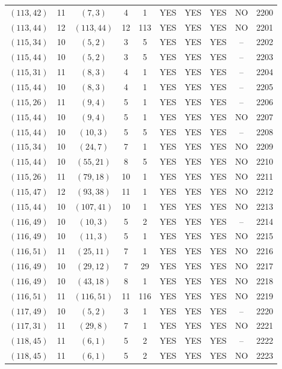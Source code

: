 \begin{longtable}{|c|c|c|c|c|c|c|c|c|c|}
$(113, 42)$ & 11 & $(7, 3)$ & 4 & 1 & YES & YES & YES & NO & 2200\\
$(113, 44)$ & 12 & $(113, 44)$ & 12 & 113 & YES & YES & YES & NO & 2201\\
$(115, 34)$ & 10 & $(5, 2)$ & 3 & 5 & YES & YES & YES & -- & 2202\\
$(115, 44)$ & 10 & $(5, 2)$ & 3 & 5 & YES & YES & YES & -- & 2203\\
$(115, 31)$ & 11 & $(8, 3)$ & 4 & 1 & YES & YES & YES & -- & 2204\\
$(115, 44)$ & 10 & $(8, 3)$ & 4 & 1 & YES & YES & YES & -- & 2205\\
$(115, 26)$ & 11 & $(9, 4)$ & 5 & 1 & YES & YES & YES & -- & 2206\\
$(115, 44)$ & 10 & $(9, 4)$ & 5 & 1 & YES & YES & YES & NO & 2207\\
$(115, 44)$ & 10 & $(10, 3)$ & 5 & 5 & YES & YES & YES & -- & 2208\\
$(115, 34)$ & 10 & $(24, 7)$ & 7 & 1 & YES & YES & YES & NO & 2209\\
$(115, 44)$ & 10 & $(55, 21)$ & 8 & 5 & YES & YES & YES & NO & 2210\\
$(115, 26)$ & 11 & $(79, 18)$ & 10 & 1 & YES & YES & YES & NO & 2211\\
$(115, 47)$ & 12 & $(93, 38)$ & 11 & 1 & YES & YES & YES & NO & 2212\\
$(115, 44)$ & 10 & $(107, 41)$ & 10 & 1 & YES & YES & YES & NO & 2213\\
$(116, 49)$ & 10 & $(10, 3)$ & 5 & 2 & YES & YES & YES & -- & 2214\\
$(116, 49)$ & 10 & $(11, 3)$ & 5 & 1 & YES & YES & YES & NO & 2215\\
$(116, 51)$ & 11 & $(25, 11)$ & 7 & 1 & YES & YES & YES & NO & 2216\\
$(116, 49)$ & 10 & $(29, 12)$ & 7 & 29 & YES & YES & YES & NO & 2217\\
$(116, 49)$ & 10 & $(43, 18)$ & 8 & 1 & YES & YES & YES & NO & 2218\\
$(116, 51)$ & 11 & $(116, 51)$ & 11 & 116 & YES & YES & YES & NO & 2219\\
$(117, 49)$ & 10 & $(5, 2)$ & 3 & 1 & YES & YES & YES & -- & 2220\\
$(117, 31)$ & 11 & $(29, 8)$ & 7 & 1 & YES & YES & YES & NO & 2221\\
$(118, 45)$ & 11 & $(6, 1)$ & 5 & 2 & YES & YES & YES & -- & 2222\\
$(118, 45)$ & 11 & $(6, 1)$ & 5 & 2 & YES & YES & YES & NO & 2223\\

\end{longtable}
